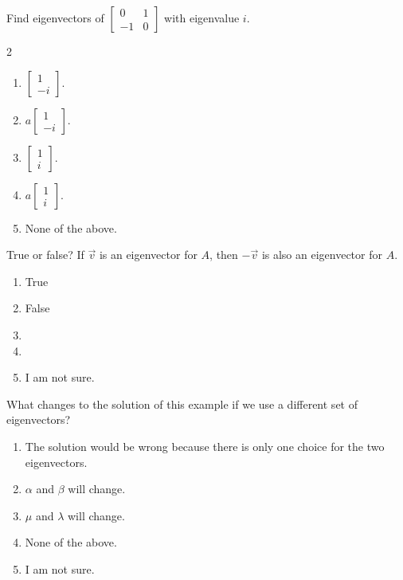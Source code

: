 \documentclass[aspectratio=169, t, 14pt]{beamer}
\begin{document}
\begin{poll}
  Find eigenvectors of \(\begin{bmatrix} 0 & 1 \\ -1 & 0 \end{bmatrix}\) with eigenvalue \(i\).

  \begin{multicols}{2}
    \begin{enumerate}
      \item \(\begin{bmatrix} 1 \\  -i\end{bmatrix}\).
      \item \(a\begin{bmatrix} 1 \\ -i\end{bmatrix}\).
      \item \(\begin{bmatrix} 1 \\ i\end{bmatrix}\).
      \item \(a\begin{bmatrix} 1 \\ i\end{bmatrix}\).
      \item None of the above.
    \end{enumerate}
  \end{multicols}
\end{poll}

\begin{poll}
  True or false? If \(\vec{v}\) is an eigenvector for \(A\), then \(-\vec{v}\) is also an eigenvector for \(A\).

  \begin{enumerate}
    \item True
    \item False
    \item 
    \item 
    \item I am not sure.
  \end{enumerate}
\end{poll}

\begin{frame}
  What changes to the solution of this example if we use a different set of eigenvectors?

  \begin{enumerate}
    \item The solution would be wrong because there is only one choice for the two eigenvectors.
    \item \(\alpha\) and \(\beta\) will change.
    \item \(\mu\) and \(\lambda\) will change.
    \item None of the above.
    \item I am not sure.
  \end{enumerate}
\end{frame}
\end{document}
